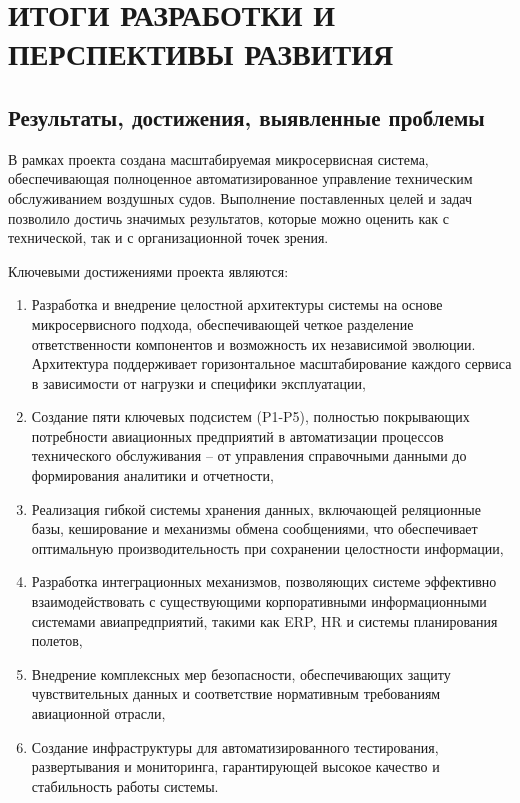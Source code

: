 \documentclass[14pt,a4paper]{extarticle}
\begin{document}
\newpage 

\section{ИТОГИ РАЗРАБОТКИ И ПЕРСПЕКТИВЫ РАЗВИТИЯ}

\subsection{Результаты, достижения, выявленные проблемы}

В рамках проекта создана масштабируемая микросервисная система, обеспечивающая полноценное автоматизированное управление техническим обслуживанием воздушных судов. Выполнение поставленных целей и задач позволило достичь значимых результатов, которые можно оценить как с технической, так и с организационной точек зрения.

Ключевыми достижениями проекта являются:

\begin{enumerate}
\item Разработка и внедрение целостной архитектуры системы на основе микросервисного подхода, обеспечивающей четкое разделение ответственности компонентов и возможность их независимой эволюции. Архитектура поддерживает горизонтальное масштабирование каждого сервиса в зависимости от нагрузки и специфики эксплуатации,

\item Создание пяти ключевых подсистем (P1-P5), полностью покрывающих потребности авиационных предприятий в автоматизации процессов технического обслуживания – от управления справочными данными до формирования аналитики и отчетности,

\item Реализация гибкой системы хранения данных, включающей реляционные базы, кеширование и механизмы обмена сообщениями, что обеспечивает оптимальную производительность при сохранении целостности информации,

\item Разработка интеграционных механизмов, позволяющих системе эффективно взаимодействовать с существующими корпоративными информационными системами авиапредприятий, такими как ERP, HR и системы планирования полетов,

\item Внедрение комплексных мер безопасности, обеспечивающих защиту чувствительных данных и соответствие нормативным требованиям авиационной отрасли,

\item Создание инфраструктуры для автоматизированного тестирования, развертывания и мониторинга, гарантирующей высокое качество и стабильность работы системы.
\end{enumerate}
\end{document}
